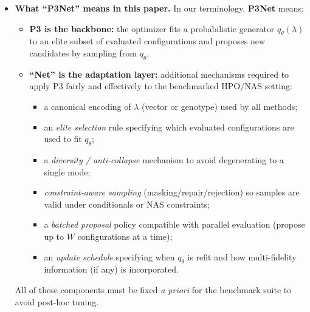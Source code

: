 \begin{itemize}
    \item \textbf{What ``P3Net'' means in this paper.}
    In our terminology, \textbf{P3Net} means:
    \begin{itemize}
        \item \textbf{P3 is the backbone:} the optimizer fits a probabilistic generator \(q_{\theta}(\lambda)\) to an elite subset of evaluated configurations
        and proposes new candidates by sampling from \(q_{\theta}\).
        \item \textbf{``Net'' is the adaptation layer:} additional mechanisms required to apply P3 fairly and effectively to the benchmarked HPO/NAS setting:
        \begin{itemize}
            \item a canonical encoding of \(\lambda\) (vector or genotype) used by all methods;
            \item an \emph{elite selection} rule specifying which evaluated configurations are used to fit \(q_{\theta}\);
            \item a \emph{diversity / anti-collapse} mechanism to avoid degenerating to a single mode;
            \item \emph{constraint-aware sampling} (masking/repair/rejection) so samples are valid under conditionals or NAS constraints;
            \item a \emph{batched proposal} policy compatible with parallel evaluation (propose up to \(W\) configurations at a time);
            \item an \emph{update schedule} specifying when \(q_{\theta}\) is refit and how multi-fidelity information (if any) is incorporated.
        \end{itemize}
    \end{itemize}
    All of these components must be fixed \emph{a priori} for the benchmark suite to avoid post-hoc tuning.


\end{itemize}
